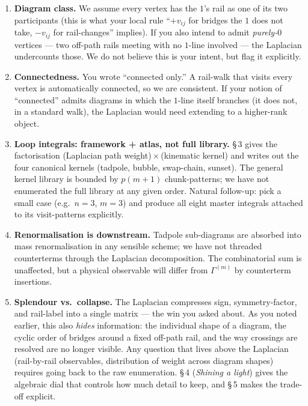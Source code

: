 \documentclass[11pt,a4paper]{article}
\begin{document}
\begin{enumerate}[leftmargin=2em,itemsep=4pt]
  \item \textbf{Diagram class.} We assume every vertex has the $1$'s rail as
        one of its two participants (this is what your local rule
        ``$+v_{ij}$ for bridges the $1$ does not take, $-v_{ij}$ for
        rail-changes'' implies). If you also intend to admit
        \emph{purely-$0$} vertices --- two off-path rails meeting with no
        $1$-line involved --- the Laplacian undercounts those. We do not
        believe this is your intent, but flag it explicitly.

  \item \textbf{Connectedness.} You wrote ``connected only.'' A rail-walk
        that visits every vertex is automatically connected, so we are
        consistent. If your notion of ``connected'' admits diagrams in which
        the $1$-line itself branches (it does not, in a standard walk), the
        Laplacian would need extending to a higher-rank object.

  \item \textbf{Loop integrals: framework + atlas, not full library.}
        \S\,3 gives the factorisation
        (Laplacian path weight)\,$\times$\,(kinematic kernel) and writes
        out the four canonical kernels (tadpole, bubble, swap-chain,
        sunset). The general kernel library is bounded by $p(m{+}1)$
        chunk-patterns; we have not enumerated the full library at any
        given order. Natural follow-up: pick a small case (e.g.\ $n{=}3$,
        $m{=}3$) and produce all eight master integrals
        attached to its visit-patterns explicitly.

  \item \textbf{Renormalisation is downstream.} Tadpole sub-diagrams are
        absorbed into mass renormalisation in any sensible scheme; we have
        not threaded counterterms through the Laplacian decomposition. The
        combinatorial sum is unaffected, but a physical observable will
        differ from $\Gamma^{(m)}$ by counterterm insertions.

  \item \textbf{Splendour vs.\ collapse.} The Laplacian compresses sign,
        symmetry-factor, and rail-label into a single matrix --- the win
        you asked about. As you noted earlier, this also \emph{hides}
        information: the individual shape of a diagram, the cyclic order
        of bridges around a fixed off-path rail, and the way crossings are
        resolved are no longer visible. Any question that lives above the
        Laplacian (rail-by-rail observables, distribution of weight across
        diagram shapes) requires going back to the raw enumeration.
        \S\,4 (\emph{Shining a light}) gives the algebraic dial that
        controls how much detail to keep, and \S\,5 makes the trade-off
        explicit.


\end{enumerate}
\end{document}
